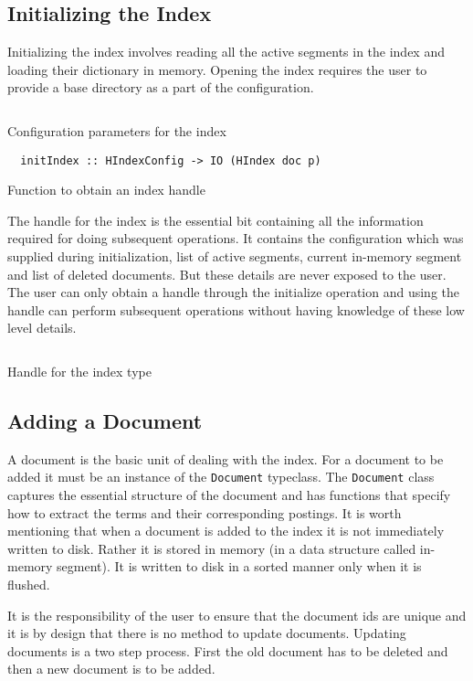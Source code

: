 \subsection{Initializing the Index}
Initializing the index involves reading all the active segments in the index and loading their dictionary in memory.
Opening the index requires the user to provide a base directory as a part of the configuration.
\begin{listing}
\inputminted{haskell}{hs/hconfig.hs}
\caption{Configuration parameters for the index}
\end{listing}

\begin{listing}
\begin{verbatim}
  initIndex :: HIndexConfig -> IO (HIndex doc p)
\end{verbatim}
\caption{Function to obtain an index handle}
\end{listing}

The handle for the index is the essential bit containing all the information required for doing subsequent operations.
It contains the configuration which was supplied during initialization, list of active segments,
current in-memory segment and list of deleted documents.
But these details are never exposed to the user.
The user can only obtain a handle through the initialize operation and using the handle can perform subsequent operations without
having knowledge of these low level details.
\begin{listing}
\inputminted{haskell}{hs/hindex.hs}
\caption{Handle for the index type}
\end{listing}


\subsection{Adding a Document}
A document is the basic unit of dealing with the index. For a document to be added it must be an instance of the \texttt{Document} typeclass.
The \texttt{Document} class captures the essential structure of the document and has functions that specify how to extract the terms and their corresponding postings.
It is worth mentioning that when a document is added to the index it is not immediately written to disk.
Rather it is stored in memory (in a data structure called in-memory segment). It is written to disk in a sorted manner only when it is flushed.

It is the responsibility of the user to ensure that the document ids are unique and it is by design that there is no method to update documents.
Updating documents is a two step process. First the old document has to be deleted and then a new document is to be added.

